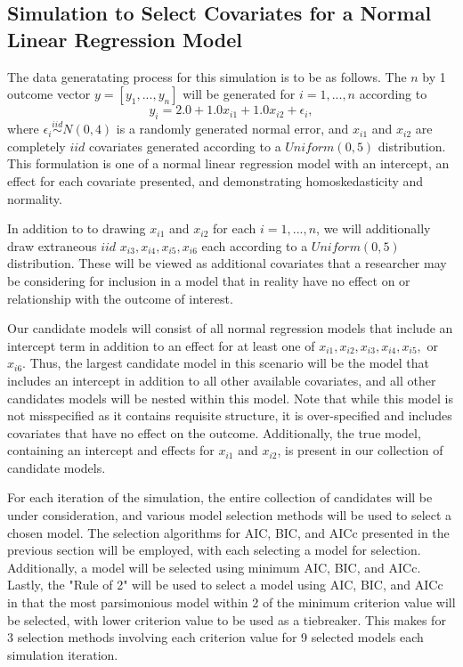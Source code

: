 		\subsection{Simulation to Select Covariates for a Normal Linear Regression Model}

		The data generatating process for this simulation is to be as follows. The $n$ by 1 outcome vector $y = [y_1,...,y_n]$ will be generated for $i = 1,...,n$ according
		to
		\begin{equation}
			y_i = 2.0 + 1.0 x_{i1} + 1.0 x_{i2} + \epsilon_i , 
		\end{equation}
		where $\epsilon_i \stackrel{iid}{\sim} N(0,4)$ is a randomly generated normal error, and $x_{i1}$ and $x_{i2}$ are completely $iid$ covariates generated according to
		a $Uniform(0,5)$ distribution. This formulation is one of a normal linear regression model with an intercept, an effect for each covariate presented, and
		demonstrating homoskedasticity and normality.

		In addition to to drawing $x_{i1}$ and $x_{i2}$ for each $i=1,...,n$, we will additionally draw extraneous $iid$ $x_{i3},x_{i4},x_{i5},x_{i6}$ each according to a
		$Uniform(0,5)$ distribution. These will be viewed as additional covariates that a researcher may be considering for inclusion in a model that in reality have
		no effect on or relationship with the outcome of interest.
		
		Our candidate models will consist of all normal regression models that include an intercept term in addition to an effect for at least one of 
		$x_{i1},x_{i2},x_{i3},x_{i4},x_{i5},$ or $x_{i6}$. Thus, the largest candidate model in this scenario will be the model that includes an intercept
		in addition to all other available covariates, and all other candidates models will be nested within this model. Note that while this model is not
		misspecified as it contains requisite structure, it is over-specified and includes covariates that have no effect on the outcome. Additionally, the
		true model, containing an intercept and effects for $x_{i1}$ and $x_{i2}$, is present in our collection of candidate models.

		For each iteration of the simulation, the entire collection of candidates will be under consideration, and various model selection methods will be
		used to select a chosen model. The selection algorithms for AIC, BIC, and AICc presented in the previous section will be employed, with each selecting a model
		for selection. Additionally, a model will be selected using minimum AIC, BIC, and AICc. Lastly, the "Rule of 2" will be used to select a model using AIC,
		BIC, and AICc in that the most parsimonious model within 2 of the minimum criterion value will be selected, with lower criterion value to be used as a 
		tiebreaker. This makes for 3 selection methods involving each criterion value for 9 selected models each simulation iteration.

